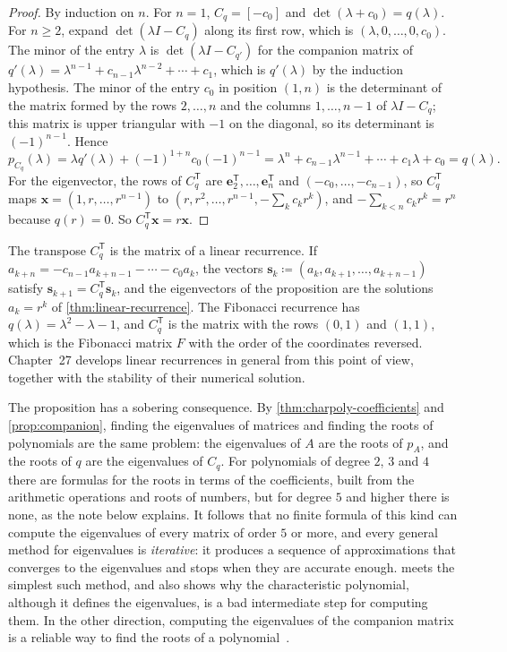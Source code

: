 \begin{proof}
By induction on $n$. For $n=1$, $C_q=[-c_0]$ and $\det(\lambda+c_0)=q(\lambda)$. For $n\ge2$, expand $\det(\lambda I-C_q)$ along its first row, which is $(\lambda,0,\ldots,0,c_0)$. The minor of the entry $\lambda$ is $\det(\lambda I-C_{q'})$ for the companion matrix of $q'(\lambda)=\lambda^{n-1}+c_{n-1}\lambda^{n-2}+\cdots+c_1$, which is $q'(\lambda)$ by the induction hypothesis. The minor of the entry $c_0$ in position $(1,n)$ is the determinant of the matrix formed by the rows $2,\ldots,n$ and the columns $1,\ldots,n-1$ of $\lambda I-C_q$; this matrix is upper triangular with $-1$ on the diagonal, so its determinant is $(-1)^{n-1}$. Hence
\[
p_{C_q}(\lambda)=\lambda q'(\lambda)+(-1)^{1+n}c_0(-1)^{n-1}=\lambda^n+c_{n-1}\lambda^{n-1}+\cdots+c_1\lambda+c_0=q(\lambda).
\]
For the eigenvector, the rows of $C_q^{\mathsf T}$ are $\mathbf e_2^{\mathsf T},\ldots,\mathbf e_n^{\mathsf T}$ and $(-c_0,\ldots,-c_{n-1})$, so $C_q^{\mathsf T}$ maps $\mathbf x=(1,r,\ldots,r^{n-1})$ to $(r,r^2,\ldots,r^{n-1},-\sum_kc_kr^k)$, and $-\sum_{k<n}c_kr^k=r^n$ because $q(r)=0$. So $C_q^{\mathsf T}\mathbf x=r\mathbf x$.
\end{proof}

The transpose $C_q^{\mathsf T}$ is the matrix of a linear recurrence. If $a_{k+n}=-c_{n-1}a_{k+n-1}-\cdots-c_0a_k$, the vectors $\mathbf s_k\coloneqq(a_k,a_{k+1},\ldots,a_{k+n-1})$ satisfy $\mathbf s_{k+1}=C_q^{\mathsf T}\mathbf s_k$, and the eigenvectors of the proposition are the solutions $a_k=r^k$ of \cref{thm:linear-recurrence}. The Fibonacci recurrence has $q(\lambda)=\lambda^2-\lambda-1$, and $C_q^{\mathsf T}$ is the matrix with the rows $(0,1)$ and $(1,1)$, which is the Fibonacci matrix $F$ with the order of the coordinates reversed. Chapter~27 develops linear recurrences in general from this point of view, together with the stability of their numerical solution.

The proposition has a sobering consequence. By \cref{thm:charpoly-coefficients} and \cref{prop:companion}, finding the eigenvalues of matrices and finding the roots of polynomials are the same problem: the eigenvalues of $A$ are the roots of $p_A$, and the roots of $q$ are the eigenvalues of $C_q$. For polynomials of degree $2$, $3$ and $4$ there are formulas for the roots in terms of the coefficients, built from the arithmetic operations and roots of numbers, but for degree $5$ and higher there is none, as the note below explains. It follows that no finite formula of this kind can compute the eigenvalues of every matrix of order $5$ or more, and every general method for eigenvalues is \emph{iterative}: it produces a sequence of approximations that converges to the eigenvalues and stops when they are accurate enough.  meets the simplest such method, and also shows why the characteristic polynomial, although it defines the eigenvalues, is a bad intermediate step for computing them. In the other direction, computing the eigenvalues of the companion matrix is a reliable way to find the roots of a polynomial~\cite{edelman1995}.

